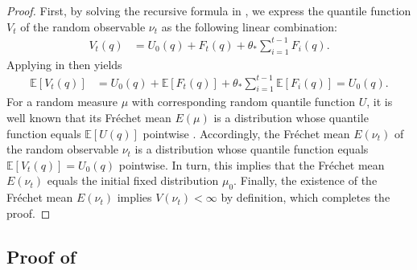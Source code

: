 \documentclass[a4paper, 11pt]{article}
\newcommand{\E}{\mathbb E}
\theoremstyle{definition}
\begin{document}
\begin{proof}
    First, by solving the recursive formula in , we express the quantile function $V_t$ of the random observable $\nu_t$ as the following linear combination:
	\begin{align}
		V_t(q) & = U_0(q) +  F_t(q) + \theta_* \sum_{i=1}^{t-1} F_i(q) .
	\end{align}
	Applying  in  then yields
	\begin{align}
		\E[ V_t(q) ] & = U_0(q) + \E[ F_t(q) ] + \theta_* \sum_{i=1}^{t-1} \E[ F_i(q) ] = U_0(q) . 
	\end{align}
    For a random measure $\mu$ with corresponding random quantile function $U$, it is well known that its Fr\'{e}chet mean $E(\mu)$ is a distribution whose quantile function equals $\E[ U(q) ]$ pointwise \citep[see, e.g.,][Theorem 3.2.11]{Panaretos2020}.
    Accordingly, the Fr\'{e}chet mean $E(\nu_t)$ of the random observable $\nu_t$ is a distribution whose quantile function equals $\E[ V_t(q) ] = U_0(q)$ pointwise.
	In turn, this implies that the Fr\'{e}chet mean $E(\nu_t)$ equals the initial fixed distribution $\mu_0$.
	Finally, the existence of the Fr\'{e}chet mean $E(\nu_t)$ implies $V(\nu_t) < \infty$ by definition, which completes the proof.
\end{proof}



\subsection{Proof of } \label{apx:proof_residual_autocovariance}
\end{document}
